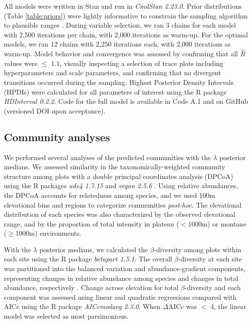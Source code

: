 \documentclass[preprint,final,times,12pt,3p]{elsarticle}
\begin{document}
All models were written in Stan \citep{Carpenter2017} and run in \emph{CmdStan 2.23.0}. Prior distributions (Table \ref{table:priors}) were lightly informative to constrain the sampling algorithm to plausible ranges \citep{Carpenter2017,Lemoine2019}. During variable selection, we ran 3 chains for each model with 2,500 iterations per chain, with 2,000 iterations as warm-up. For the optimal models, we ran 12 chains with 2,250 iterations each, with 2,000 iterations as warm-up. Model behavior and convergence was assessed by confirming that all $\hat{R}$ values were $\leq$ 1.1, visually inspecting a selection of trace plots including hyperparameters and scale parameters, and confirming that no divergent transitions occurred during the sampling. Highest Posterior Density Intervals (HPDIs) were calculated for all parameters of interest using the R package \emph{HDInterval 0.2.2}. Code for the full model is available in Code A.1 and on GitHub (versioned DOI upon acceptance).


\subsection{Community analyses}
We performed several analyses of the predicted communities with the $\lambda$ posterior medians. We assessed similarity in the taxonomically-weighted community structure among plots with a double principal coordinates analysis (DPCoA) using the R packages \emph{ade4 1.7.15} and \emph{vegan 2.5.6} \citep{Dray2015,Pavoine2019}. Using relative abundances, the DPCoA accounts for relatedness among species, and we used 100m elevational bins and regions to categorize communities \emph{post-hoc}. The elevational distribution of each species was also characterized by the observed elevational range, and by the proportion of total intensity in plateau ($<$1000m) or montane ($\geq$1000m) environments.

With the $\lambda$ posterior medians, we calculated the $\beta$-diversity among plots within each site using the R package \emph{betapart 1.5.1}. The overall $\beta$-diversity at each site was partitioned into the balanced variation and abundance-gradient components, representing changes in relative abundance among species and changes in total abundance, respectively \citep{Baselga2017}. Change across elevation for total $\beta$-diversity and each component was assessed using linear and quadratic regressions compared with AICc using the R package \emph{AICcmodavg 2.3.0}. When $\Delta$AICc was $<$ 4, the linear model was selected as most parsimonious. 
\end{document}
